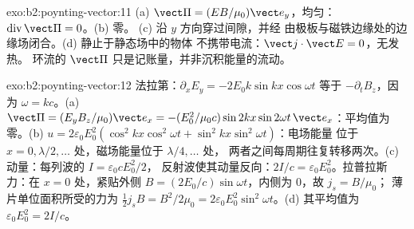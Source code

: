 \begin{solution}{exo:b2:poynting-vector:11}
(a) $\vect\Pi = (EB/\mu_0)\vect e_y$，均匀：$\operatorname{div}\vect\Pi = 0$。(b) 零。
(c) 沿 $y$ 方向穿过间隙，并经
由极板与磁铁边缘处的边缘场闭合。(d) 静止于静态场中的物体
不携带电流：$\vect j\cdot\vect E = 0$，无发热。
环流的 $\vect\Pi$ 只是记账量，并非沉积能量的流动。
\end{solution}

\begin{solution}{exo:b2:poynting-vector:12}
法拉第：$\partial_xE_y = -2E_0k\sin kx\cos\omega t$ 等于 $-\partial_tB_z$，因为
$\omega = kc$。(a)
$\vect\Pi = (E_yB_z/\mu_0)\vect e_x = -(E_0^2/\mu_0c)\sin2kx\sin2\omega t\,\vect e_x$：平均值为
零。(b) $u = 2\varepsilon_0E_0^2(\cos^2kx\cos^2\omega t + \sin^2kx\sin^2\omega t)$：电场能量
位于 $x = 0, \lambda/2, \dots$ 处，磁场能量位于 $\lambda/4, \dots$ 处，
两者之间每周期往复转移两次。(c) 动量：每列波的 $I = \varepsilon_0cE_0^2/2$，
反射波使其动量反向：$2I/c = \varepsilon_0E_0^2$。拉普拉斯力：在 $x =
0$ 处，紧贴外侧 $B = (2E_0/c)\sin\omega t$，内侧为 $0$，故 $j_s = B/\mu_0$；
薄片单位面积所受的力为 $\tfrac12j_sB = B^2/2\mu_0 = 2\varepsilon_0E_0^2\sin^2
\omega t$。(d) 其平均值为 $\varepsilon_0E_0^2 = 2I/c$。
\end{solution}

